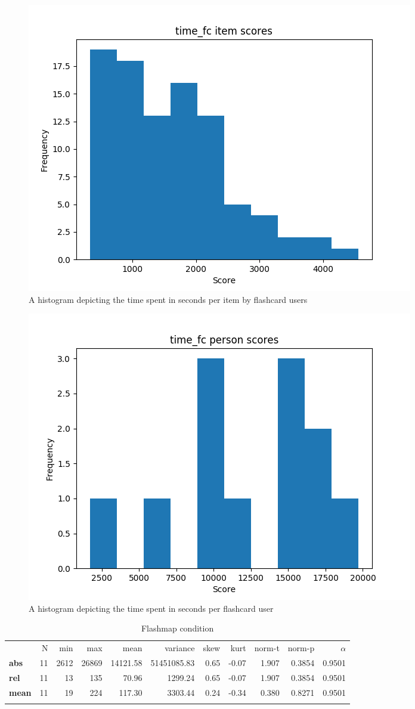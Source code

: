 \begin{figure}
    \centering
    \includegraphics[width=.7\textwidth]{img/time_fc_diff.png}
    \caption{A histogram depicting the time spent in seconds per item by flashcard users} 
    \label{fig:time_fc_diff}
\end{figure}
\begin{figure}
    \centering
    \includegraphics[width=.7\textwidth]{img/time_fc_abil.png}
    \caption{A histogram depicting the time spent in seconds per flashcard user}
    \label{fig:time_fc_abil}
\end{figure}

\begin{longtable}[c]{@{}lrrrrrrrrrr@{}}
\caption{Flashmap condition}
\endfirsthead
\toprule\addlinespace
& N & min & max & mean & variance & skew & kurt & norm-t &
norm-p & $\alpha$
\\\addlinespace
\midrule
\textbf{abs} & 11 & 2612 & 26869 & 14121.58 & 51451085.83 & 0.65 & -0.07
& 1.907 & 0.3854 & 0.9501
\\\addlinespace
\textbf{rel} & 11 & 13 & 135 & 70.96 & 1299.24 & 0.65 & -0.07 & 1.907 &
0.3854 & 0.9501
\\\addlinespace
\textbf{mean} & 11 & 19 & 224 & 117.30 & 3303.44 & 0.24 & -0.34 & 0.380
& 0.8271 & 0.9501
\\\addlinespace
\bottomrule
    \label{tab:time_fm}
\end{longtable}

